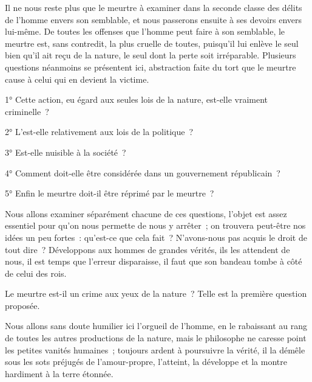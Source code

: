 \documentclass[french,twoside]{book} %
\begin{document}
Il ne nous reste plus que le meurtre à examiner dans la seconde classe des délits de l’homme envers son semblable, et nous passerons ensuite à ses devoirs envers lui-même. De toutes les offenses que l’homme peut faire à son semblable, le meurtre est, sans contredit, la plus cruelle de toutes, puisqu’il lui enlève le seul bien qu’il ait reçu de la nature, le seul dont la perte soit irréparable. Plusieurs questions néanmoins se présentent ici, abstraction faite du tort que le meurtre cause à celui qui en devient la victime.\par
1° Cette action, eu égard aux seules lois de la nature, est-elle vraiment criminelle ?\par
2° L’est-elle relativement aux lois de la politique ?\par
3° Est-elle nuisible à la société ?\par
4° Comment doit-elle être considérée dans un gouvernement républicain ?\par
5° Enfin le meurtre doit-il être réprimé par le meurtre ?\par
Nous allons examiner séparément chacune de ces questions, l’objet est assez essentiel pour qu’on nous permette de nous y arrêter ; on trouvera peut-être nos idées un peu fortes : qu’est-ce que cela fait ? N’avons-nous pas acquis le droit de tout dire ? Développons aux hommes de grandes vérités, ils les attendent de nous, il est temps que l’erreur disparaisse, il faut que son bandeau tombe à côté de celui des rois.\par
Le meurtre est-il un crime aux yeux de la nature ? Telle est la première question proposée.\par
Nous allons sans doute humilier ici l’orgueil de l’homme, en le rabaissant au rang de toutes les autres productions de la nature, mais le philosophe ne caresse point les petites vanités humaines ; toujours ardent à poursuivre la vérité, il la démêle sous les sots préjugés de l’amour-propre, l’atteint, la développe et la montre hardiment à la terre étonnée.\par
\end{document}
